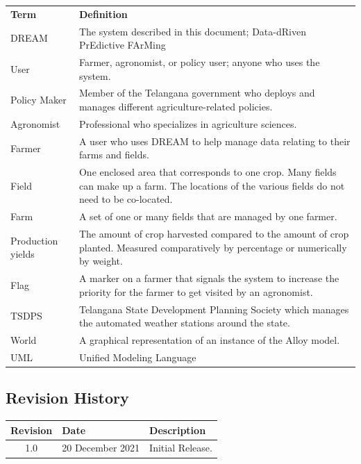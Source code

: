 
\begin{center}
\renewcommand{\arraystretch}{1.25}
\begin{tabular}{l >{\raggedright\arraybackslash}p{12cm} } \hline
    \textbf{Term} & \textbf{Definition}\\ 
    DREAM & The system described in this document; Data-dRiven PrEdictive FArMing\\
    User & Farmer, agronomist, or policy user; anyone who uses the system.\\
	Policy Maker & Member of the Telangana government who deploys and manages different agriculture-related policies. \\
	Agronomist & Professional who specializes in agriculture sciences. \\
    Farmer & A user who uses DREAM to help manage data relating to their farms and fields.\\
    Field & One enclosed area that corresponds to one crop. Many fields can make up a farm. The locations of the various fields do not need to be co-located.\\
    Farm & A set of one or many fields that are managed by one farmer.\\
    Production yields & The amount of crop harvested compared to the amount of crop planted. Measured comparatively by percentage or numerically by weight.\\
    Flag & A marker on a farmer that signals the system to increase the priority for the farmer to get visited by an agronomist.\\
    TSDPS & Telangana State Development Planning Society which manages the automated weather stations around the state. \\
    World & A graphical representation of an instance of the Alloy model.\\
    UML & Unified Modeling Language\\
    \hline
\end{tabular}
\end{center}

\subsection{Revision History}


\begin{flushleft}
\renewcommand{\arraystretch}{1.25}
\begin{tabular}{|c| l|>{\raggedright\arraybackslash}p{12cm} |} \hline
    \textbf{Revision} & \textbf{Date} & \textbf{Description}\\ \hline 
    1.0 & 20 December 2021 & Initial Release.\\
    \hline
\end{tabular}
\end{flushleft}


